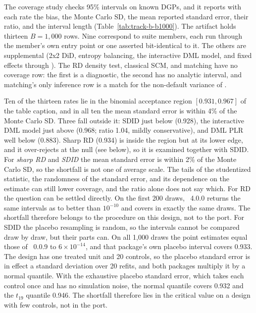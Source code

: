 The coverage study checks 95\% intervals on known DGPs, and it reports with
each rate the bias, the Monte Carlo SD, the mean reported standard error,
their ratio, and the interval length (Table~\ref{tab:track-b-b1000}). The artifact holds
thirteen \(B=1{,}000\) rows. Nine correspond to suite members, each run
through the member's own entry point or one asserted bit-identical to it.
The others are supplemental (2x2 DiD, entropy balancing, the interactive
DML model, and fixed effects through ). The RD density test,
classical SCM, and matching have no coverage row: the first is a diagnostic,
the second has no analytic interval, and matching's only inference row is a
 match for the non-default variance of
\citet{abadie2016matching}.

Ten of the thirteen rates lie in the binomial acceptance region
\([0.931,0.967]\) of the table caption, and in all ten the mean standard
error is within 4\% of the Monte Carlo SD. Three fall outside it: SDID
just below (0.928), the interactive DML model just above (0.968; ratio
1.04, mildly conservative), and DML PLR well below (0.883). Sharp RD
(0.934) is inside the region but at its lower edge, and it over-rejects
at the null (see below), so it is examined together with SDID. For \emph{sharp RD} and \emph{SDID} the
mean standard error is within 2\% of the Monte Carlo SD, so the
shortfall is not one of average scale. The tails of the studentized
statistic, the randomness of the standard error, and its dependence on
the estimate can still lower coverage, and the ratio alone does not say
which. For RD the question can be settled directly. On the first 200
draws,  ~4.0.0 returns the same intervals as
\statspai{} to better than \(10^{-10}\) and covers in exactly the same draws.
The shortfall therefore belongs to the procedure on this design, not to
the port. For SDID the placebo resampling is random, so the intervals
cannot be compared draw by draw, but their parts can. On all 1{,}000 draws
the point estimates equal those of ~0.0.9 to
\(6\times10^{-14}\), and that package's own placebo interval covers 0.933.
The design has one treated unit and 20 controls, so the placebo standard
error is in effect a standard deviation over 20 refits, and both packages
multiply it by a normal quantile. With the exhaustive placebo standard
error, which takes each control once and has no simulation noise, the normal
quantile covers 0.932 and the \(t_{19}\) quantile 0.946. The shortfall
therefore lies in the critical value on a design with few controls, not in
the port.

